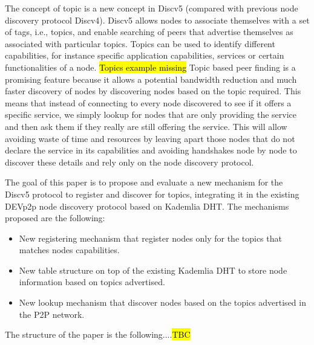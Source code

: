 The concept of topic is a new concept in Discv5 (compared with previous node discovery protocol Discv4).
Discv5 allows nodes to associate themselves with a set of tags, i.e., topics, and enable searching of peers that advertise themselves as associated with particular topics.  
Topics can be used to identify different  capabilities, for instance specific application capabilities,  services or certain functionalities of a node. 
\hl{Topics example missing}
Topic based peer finding is a promising feature because it allows a potential bandwidth reduction and much faster discovery of nodes
by  discovering nodes based on the topic required.
This means that instead of connecting to every node discovered to see if it offers a specific service,  we simply lookup for nodes that are only providing the service and then ask them if they really are still offering the service.
This will allow avoiding waste of time and resources by leaving apart those nodes that do not declare the service in its capabilities and avoiding handshakes node by node to discover these details and rely only on the node discovery protocol. 



The goal of this paper is to propose and evaluate a new mechanism for the Discv5 protocol to register and discover for topics,  integrating it in the existing DEVp2p node discovery protocol based on Kademlia DHT.  
The mechanisms proposed are the following:

\begin{itemize}
 \item New registering mechanism that register nodes only for the topics that matches nodes capabilities.
 \item New table structure on top of the existing Kademlia DHT to store node information based on topics advertised.
 \item New lookup mechanism that discover nodes based on the topics advertised in the P2P network.
\end{itemize}
    
The structure of the paper is the following....\hl{TBC}
